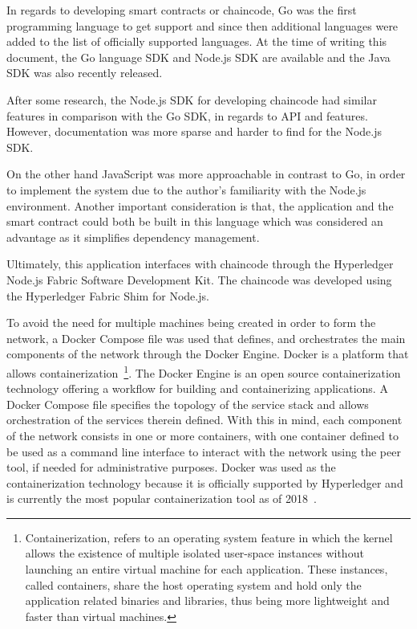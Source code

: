 In regards to developing smart contracts or chaincode, Go was the first
programming language to get support and since then additional languages were
added to the list of officially supported languages. At the time of writing
this document, the Go language SDK and Node.js SDK are available and the Java
SDK was also recently released. 

After some research, the Node.js SDK for developing chaincode had similar
features in comparison with the Go SDK, in regards to API and features.
However, documentation was more sparse and harder to find for the Node.js SDK. 

On the other hand JavaScript was more approachable in contrast to Go, in order
to implement the system due to the author's familiarity with the Node.js
environment. Another important consideration is that, the application and the
smart contract could both be built in this language which was considered an
advantage as it simplifies dependency management. 

Ultimately, this application interfaces with chaincode through the Hyperledger
Node.js Fabric Software Development Kit. The chaincode was developed using the
Hyperledger Fabric Shim for Node.js.

To avoid the need for multiple machines being created in order to form the
network, a Docker Compose file was used that defines, and orchestrates the main
components of the network through the Docker Engine. Docker is a platform that
allows containerization~\footnote{Containerization, refers to an operating
system feature in which the kernel allows the existence of multiple isolated
user-space instances without launching an entire virtual machine for each
application. These instances, called containers, share the host operating
system and hold only the application related binaries and libraries, thus being
more lightweight and faster than virtual machines.}. The Docker Engine is an
open source containerization technology offering a workflow for building and
containerizing applications. A Docker Compose file specifies the topology of
the service stack and allows orchestration of the services therein defined.
With this in mind, each component of the network consists in one or more
containers, with one container defined to be used as a command line interface
to interact with the network using the peer tool, if needed for administrative
purposes. Docker was used as the containerization technology because it is
officially supported by Hyperledger and is currently the most popular
containerization tool as of
2018~\cite{dockerAdoption2018,containerAdoption2018}.


